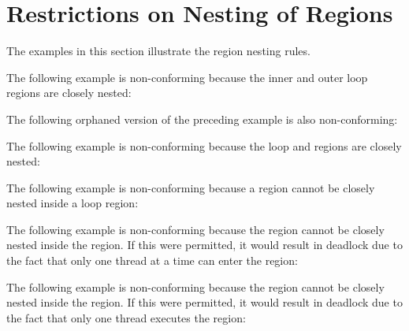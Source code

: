 \section{Restrictions on Nesting of Regions}
\label{sec:nesting_restrict}

The examples in this section illustrate the region nesting rules. 

The following example is non-conforming because the inner and outer loop regions 
are closely nested:



The following orphaned version of the preceding example is also non-conforming:



The following example is non-conforming because the loop and  regions 
are closely nested:



The following example is non-conforming because a  region cannot 
be closely nested inside a loop region:



The following example is non-conforming because the  region cannot 
be closely nested inside the  region. If this were permitted, 
it would result in deadlock due to the fact that only one thread at a time can 
enter the  region:



The following example is non-conforming because the  region cannot 
be closely nested inside the  region. If this were permitted, it 
would result in deadlock due to the fact that only one thread executes the  
region:




